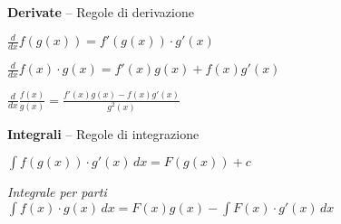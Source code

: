 \documentclass[10pt]{article}
\begin{document}
\begin{multicols}{2}
\textbf{Derivate} -- Regole di derivazione
\begin{center}
	\begin{list}{}{}
		\item $\frac{d}{dx} f(g(x)) = f'(g(x)) \cdot g'(x)$
		\item $\frac{d}{dx} f(x) \cdot g(x) = f'(x)g(x) + f(x)g'(x)$
		\item $\frac{d}{dx} \frac{f(x)}{g(x)} = \frac{f'(x)g(x) - f(x)g'(x)}{g^2(x)}$
	\end{list}
\end{center}
\columnbreak
\textbf{Integrali} -- Regole di integrazione
\begin{center}
	\begin{list}{}{}
		\item $\int f(g(x))\cdot g'(x)\,dx = F(g(x)) + c$
		\item \textit{Integrale per parti}\\$\int f(x)\cdot g(x)\,dx = F(x)g(x) - \int F(x)\cdot g'(x)\,dx$
	\end{list}
\end{center}
\end{multicols}
\end{document}
